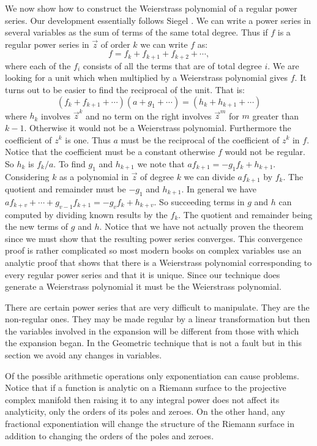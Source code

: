 We now show how to construct the Weierstrass polynomial of a regular
power series.  Our development essentially follows Siegel
\cite{Siegel1989-cl}.  We can write a power series in several
variables as the sum of terms of the same total degree.  Thus if $f$
is a regular power series in $\vec z$ of order $k$ we can write $f$
as:
\[
f = f_k + f_{k+1} + f_{k+2} + \cdots,
\]
where each of the $f_i$ consists of all the terms that are of total degree
$i$.  We are looking for a unit which when multiplied by a Weierstrass
polynomial gives $f$.  It turns out to be easier to find the reciprocal
of the unit.  That is: 
\[
(f_k + f_{k+1} + \cdots) (a + g_1 + \cdots) = (h_k + h_{k+1} + \cdots)
\]
where $h_k$ involves ${\vec z}^k$ and no term on the right involves
${\vec z}^m$ for $m$ greater than $k - 1$. Otherwise it would not be a
Weierstrass polynomial.  Furthermore the coefficient of $z^k$ is one.
Thus $a$ must be the reciprocal of the coefficient of $z^k$ in $f$.
Notice that the coefficient must be a constant otherwise $f$ would not
be regular.  So $h_k$ is $f_k / a$.  To find $g_1$ and $h_{k+1}$ we
note that $a f_{k+1} = - g_1 f_k + h_{k+1}.$ Considering $k$ as a
polynomial in $\vec z$ of degree $k$ we can divide $a f_{k+1}$ by
$f_k$.  The quotient and remainder must be $-g_1$ and $h_{k+1}$.  In
general we have $a f_{k+v} + \cdots + g_{v-1} f_{k+1} = - g_v f_k +
h_{k+v}.$ So succeeding terms in $g$ and $h$ can computed by dividing
known results by the $f_k$.  The quotient and remainder being the new
terms of $g$ and $h$.  Notice that we have not actually proven the
theorem since we must show that the resulting power series converges.
This convergence proof is rather complicated so most modern books on
complex variables use an analytic proof that shows that there is a
Weierstrass polynomial corresponding to every regular power series and
that it is unique.  Since our technique does generate a Weierstrass
polynomial it must be the Weierstrass polynomial.

There are certain power series that are very difficult to manipulate.
They are the non-regular ones.  They may be made regular by a linear
transformation but then the variables involved in the expansion will
be different from those with which the expansion began.  In the
Geometric technique that is not a fault but in this section we avoid
any changes in variables.

Of the possible arithmetic operations only exponentiation can cause
problems.  Notice that if a function is analytic on a Riemann surface
to the projective complex manifold then raising it to any integral
power does not affect its analyticity, only the orders of its poles
and zeroes.  On the other hand, any fractional exponentiation will
change the structure of the Riemann surface in addition to changing
the orders of the poles and zeroes.


